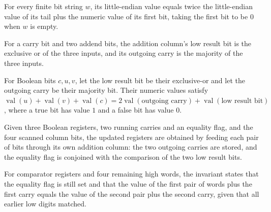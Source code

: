 \begin{lemma}
\label{Complexity.clNum_head}
\leanok
{}
For every finite bit string $w$, its little-endian value equals twice the little-endian
value of its tail plus the numeric value of its first bit, taking the first bit to be
$0$ when $w$ is empty.
\end{lemma}

\begin{definition}
\label{Complexity.clAddColumn}
\leanok
For a carry bit and two addend bits, the addition column's low result bit is the exclusive or of the three inputs, and its outgoing carry is the majority of the three inputs.
\end{definition}

\begin{lemma}
\label{Complexity.clAddColumn_value}
\leanok
{}
For Boolean bits $c,u,v$, let the low result bit be their exclusive-or and let the
outgoing carry be their majority bit. Their numeric values satisfy
$\operatorname{val}(u)+\operatorname{val}(v)+\operatorname{val}(c)=2\operatorname{val}(\text{outgoing
carry})+\operatorname{val}(\text{low result bit})$, where a true bit has value $1$ and a
false bit has value $0$.
\end{lemma}

\begin{definition}
\label{Complexity.clCmpUpdate}
\leanok
{}
Given three Boolean registers, two running carries and an equality flag, and the four scanned column bits, the updated registers are obtained by feeding each pair of bits through its own addition column: the two outgoing carries are stored, and the equality flag is conjoined with the comparison of the two low result bits.
\end{definition}

\begin{definition}
\label{Complexity.clCmpPred}
\leanok
{}
For comparator registers and four remaining high words, the invariant states that the equality flag is still set and that the value of the first pair of words plus the first carry equals the value of the second pair plus the second carry, given that all earlier low digits matched.
\end{definition}

